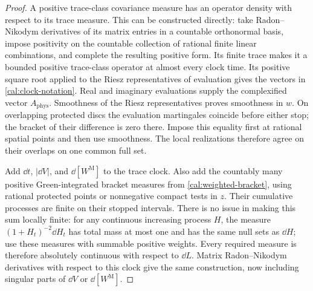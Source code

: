 \begin{proof}
A positive trace-class covariance measure has an operator density
with respect to its trace measure.  This can be constructed directly:
take Radon--Nikodym derivatives of its matrix entries in a countable
orthonormal basis, impose positivity on the countable collection of
rational finite linear combinations, and complete the resulting
positive form.  Its finite trace makes it a bounded positive
trace-class operator at almost every clock time.  Its positive square
root applied to the Riesz representatives of evaluation gives the
vectors in \eqref{cal:clock-notation}.  Real and imaginary evaluations
supply the complexified vector $A_{\mathrm{phys}}$.
Smoothness of the Riesz representatives proves smoothness in $w$.
On overlapping protected discs the evaluation martingales coincide
before either stop; the bracket of their difference is zero there.
Impose this equality first at rational spatial points and then use
smoothness.  The local realizations therefore agree on their overlaps
on one common full set.

Add $\dd t$, $|\dd V|$, and $\dd[W^{\mathrm M}]$ to the trace clock.  Also add
the countably many positive Green-integrated bracket measures from
\eqref{cal:weighted-bracket}, using rational protected points or
nonnegative compact tests in $z$.  Their cumulative processes are
finite on their stopped intervals.  There is no issue in making this
sum locally finite: for any continuous increasing process $H$, the
measure $(1+H_t)^{-2}\dd H_t$ has total mass at most one and has the
same null sets as $\dd H$; use these measures with summable positive
weights.  Every required measure is therefore absolutely continuous with respect
to $\dd L$.  Matrix
Radon--Nikodym derivatives with respect to this clock give the
same construction, now including singular parts of $\dd V$ or
$\dd[W^{\mathrm M}]$.


\end{proof}
